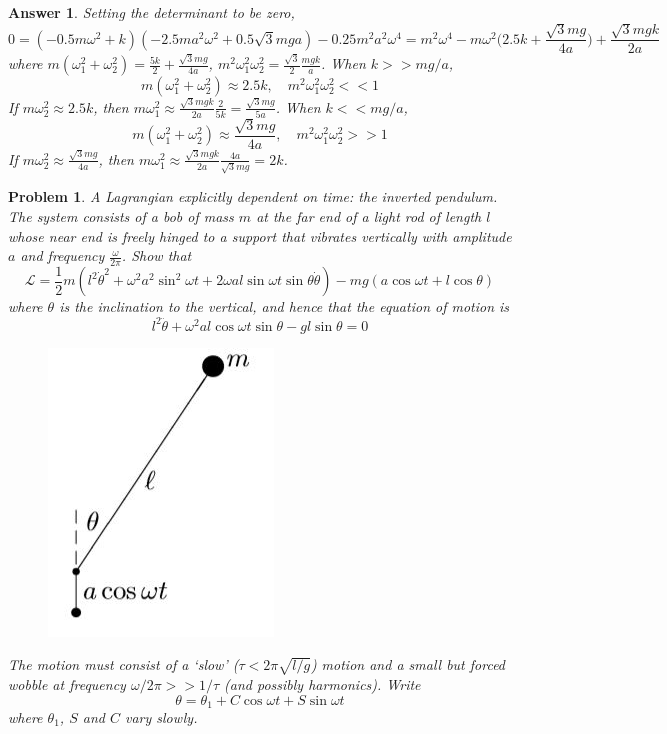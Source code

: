 \documentclass[a4paper]{article}
\newtheorem{ans}{Answer}[section]
\theoremstyle{new}
\newtheorem{qns}{Problem}[section]
\begin{document}
\begin{ans}
Setting the determinant to be zero, 
$$0=(-0.5m\omega^2+k)(-2.5ma^2\omega^2+0.5\sqrt{3}mga)-0.25m^2a^2\omega^4=m^2\omega^4-m\omega^2\bigg(2.5k+\frac{\sqrt{3}mg}{4a}\bigg)+\frac{\sqrt{3}mgk}{2a}$$
where $m(\omega_1^2+\omega_2^2)=\frac{5k}{2}+\frac{\sqrt{3}mg}{4a}$, $m^2\omega_1^2\omega_2^2=\frac{\sqrt{3}}{2}\frac{mgk}{a}$. When $k>>mg/a$,
$$m(\omega_1^2+\omega_2^2)\approx2.5k,\quad m^2\omega_1^2\omega_2^2<<1$$
If $m\omega_2^2\approx2.5k$, then $m\omega_1^2\approx\frac{\sqrt{3}mgk}{2a}\frac{2}{5k}=\frac{\sqrt{3}mg}{5a}$. When $k<<mg/a$,
$$m(\omega_1^2+\omega_2^2)\approx\frac{\sqrt{3}mg}{4a},\quad m^2\omega_1^2\omega_2^2>>1$$
If $m\omega_2^2\approx\frac{\sqrt{3}mg}{4a}$, then $m\omega_1^2\approx\frac{\sqrt{3}mgk}{2a}\frac{4a}{\sqrt{3}mg}=2k$. 
\end{ans}
\begin{qns}
A Lagrangian explicitly dependent on time: the inverted pendulum. The system consists of a bob of mass $m$ at the far end of a light rod of length $l$ whose near end is freely hinged to a support that vibrates vertically with amplitude $a$ and frequency $\frac{\omega}{2\pi}$. Show that
$$\mathcal{L}=\frac{1}{2}m(l^2\dot{\theta}^2+\omega^2a^2\sin^2\omega t+2\omega al\sin\omega t\sin\theta\dot{\theta})-mg(a\cos\omega t+l\cos\theta)$$
where $\theta$ is the inclination to the vertical, and hence that the equation of motion is
$$l^2\ddot{\theta}+\omega^2al\cos\omega t\sin\theta-gl\sin\theta=0$$
\begin{figure}[H]
    \centering
    \includegraphics[scale=0.5]{Q2.JPG}
\end{figure}
The motion must consist of a `slow' ($\tau<2\pi\sqrt{l/g}$) motion and a small but forced wobble at frequency $\omega/2\pi>>1/\tau$ (and possibly harmonics). Write
$$\theta=\theta_1+C\cos\omega t+S\sin\omega t$$
where $\theta_1$, $S$ and $C$ vary slowly.\\[5pt]

\end{qns}
\end{document}
